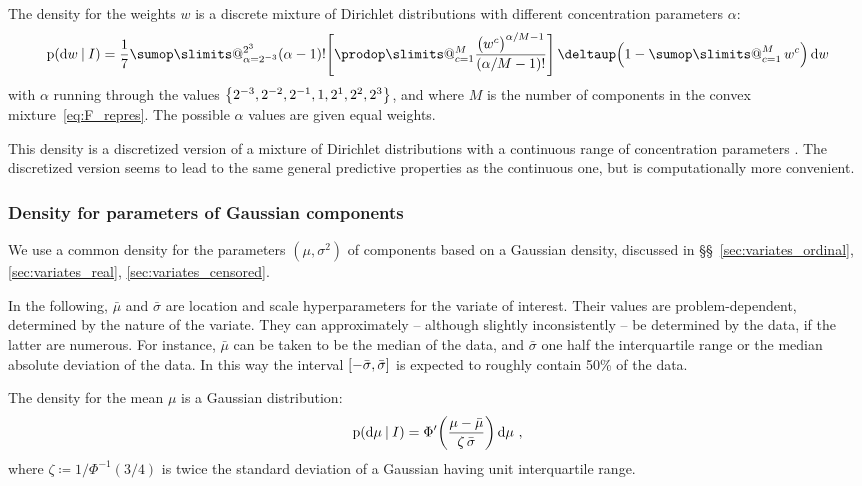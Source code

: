 \documentclass[\ifafour a4paper,12pt,\else a5paper,10pt,\fi%
onecolumn,oneside,article,%
british%
]{memoir}
\makeatletter
\theoremstyle{remark}
\theoremstyle{innote}
\def\sum{\DOTSI\sumop\slimits@}
\def\prod{\DOTSI\prodop\slimits@}
\newcommand*{\delt}{\deltaup}%
\newcommand*{\di}{\mathrm{d}}%
\newcommand*{\defd}{\coloneqq}
\DeclarePairedDelimiter\clcl{[}{]}
\DeclarePairedDelimiter\set{\{}{\}} %
\newcommand*{\p}{\mathrm{p}}%
\renewcommand*{\|}[1][]{\nonscript\:#1\vert\nonscript\:\mathopen{}}
\newcommand*{\sect}{\S}%
\newcommand*{\sects}{\S\S}%
\newcommand*{\eg}{{e.g.}}
\newcommand*{\tsum}{\mathop{\textstyle\sum}\nolimits}
\newcommand*{\muo}{\bar{\mu}}
\newcommand*{\sigmao}{\bar{\sigma}}
\makeatother
\begin{document}
The density for the weights $w$ is a discrete mixture of Dirichlet distributions with different concentration parameters $\alpha$:
\begin{equation}
  \label{eq:density_w}
  \p(\di w\|I) =
  \frac{1}{7}
  \sum_{\alpha=2^{-3}}^{2^{3}}
  (\alpha - 1)! \Biggl[\prod_{c=1}^{M}
  \frac{\bigl(w^{c}\bigr)^{\alpha/M-1}}{(\alpha/M -1)!} \Biggr]
  \, \delt\Bigl(1-\tsum_{c=1}^{M} w^{c}\Bigr)\,
  \di w
\end{equation}
with $\alpha$ running through the values $\set*{2^{-3},2^{-2},2^{-1},1,2^{1},2^{2},2^{3}}$, and where $M$ is the number of components in the convex mixture~\eqref{eq:F_repres}. The possible $\alpha$ values are given equal weights.

This density is a discretized version of a mixture of Dirichlet distributions with a continuous range of concentration parameters \autocites[\eg][\sect\,2.5]{rossi2014}[\sect\,2.1]{rasmussen1999}. The discretized version seems to lead to the same general predictive properties as the continuous one, but is computationally more convenient.


\subsubsection{Density for parameters of Gaussian components}
\label{sec:params_gaussian}

We use a common density for the parameters $(\mu,\sigma^{2})$ of components based on a Gaussian density, discussed in \sects~\ref{sec:variates_ordinal}, \ref{sec:variates_real}, \ref{sec:variates_censored}.

In the following, $\muo$ and $\sigmao$ are location and scale hyperparameters for the variate of interest. Their values are problem-dependent, determined by the nature of the variate. They can approximately -- although slightly inconsistently -- be determined by the data, if the latter are numerous. For instance, $\muo$ can be taken to be the median of the data, and $\sigmao$ one half the interquartile range or the median absolute deviation of the data. In this way the interval $\clcl{-\sigmao, \sigmao}$ is expected to roughly contain 50\% of the data.%


The density for the mean $\mu$ is a Gaussian distribution:
\begin{equation}
  \label{eq:density_mu}
  \p(\di \mu\|I) = \Phi'\biggl(\frac{\mu-\muo}{\zeta\,\sigmao}\biggr)\, \di\mu \ ,
\end{equation}
where $\zeta \defd 1/\Phi^{-1}(3/4)$ is twice the standard deviation of a Gaussian having unit interquartile range.
\end{document}
